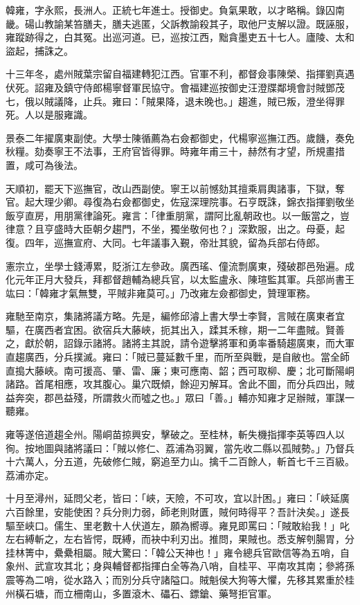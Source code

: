 \begin{pinyinscope}
韓雍，字永熙，長洲人。正統七年進士。授御史。負氣果敢，以才略稱。錄囚南畿。碭山教諭某笞膳夫，膳夫逃匿，父訴教諭殺其子，取他尸支解以證。既誣服，雍蹤跡得之，白其冤。出巡河道。已，巡按江西，黜貪墨吏五十七人。廬陵、太和盜起，捕誅之。

十三年冬，處州賊葉宗留自福建轉犯江西。官軍不利，都督僉事陳榮、指揮劉真遇伏死。詔雍及鎮守侍郎楊寧督軍民協守。會福建巡按御史汪澄牒鄰境會討賊鄧茂七，俄以賊議降，止兵。雍曰：「賊果降，退未晚也。」趨進，賊已叛，澄坐得罪死。人以是服雍識。

景泰二年擢廣東副使。大學士陳循薦為右僉都御史，代楊寧巡撫江西。歲饑，奏免秋糧。劾奏寧王不法事，王府官皆得罪。時雍年甫三十，赫然有才望，所規畫措置，咸可為後法。

天順初，罷天下巡撫官，改山西副使。寧王以前憾劾其擅乘肩輿諸事，下獄，奪官。起大理少卿。尋復為右僉都御史，佐寇深理院事。石亨既誅，錦衣指揮劉敬坐飯亨直房，用朋黨律論死。雍言：「律重朋黨，謂阿比亂朝政也。以一飯當之，豈律意？且亨盛時大臣朝夕趨門，不坐，獨坐敬何也？」深歎服，出之。母憂，起復。四年，巡撫宣府、大同。七年議事入覲，帝壯其貌，留為兵部右侍郎。

憲宗立，坐學士錢溥累，貶浙江左參政。廣西瑤、僮流剽廣東，殘破郡邑殆遍。成化元年正月大發兵，拜都督趙輔為總兵官，以太監盧永、陳瑄監其軍。兵部尚書王竑曰：「韓雍才氣無雙，平賊非雍莫可。」乃改雍左僉都御史，贊理軍務。

雍馳至南京，集諸將議方略。先是，編修邱濬上書大學士李賢，言賊在廣東者宜驅，在廣西者宜困。欲宿兵大藤峽，扼其出入，蹂其禾稼，期一二年盡賊。賢善之，獻於朝，詔錄示諸將。諸將主其說，請令遊擊將軍和勇率番騎趨廣東，而大軍直趨廣西，分兵撲滅。雍曰：「賊已蔓延數千里，而所至與戰，是自敝也。當全師直搗大藤峽。南可援高、肇、雷、廉；東可應南、韶；西可取柳、慶；北可斷陽峒諸路。首尾相應，攻其腹心。巢穴既傾，餘迎刃解耳。舍此不圖，而分兵四出，賊益奔突，郡邑益殘，所謂救火而噓之也。」眾曰「善。」輔亦知雍才足辦賊，軍謀一聽雍。

雍等遂倍道趨全州。陽峒苗掠興安，擊破之。至桂林，斬失機指揮李英等四人以徇。按地圖與諸將議曰：「賊以修仁、荔浦為羽翼，當先收二縣以孤賊勢。」乃督兵十六萬人，分五道，先破修仁賊，窮追至力山。擒千二百餘人，斬首七千三百級。荔浦亦定。

十月至潯州，延問父老，皆曰：「峽，天險，不可攻，宜以計困。」雍曰：「峽延廣六百餘里，安能使困？兵分則力弱，師老則財匱，賊何時得平？吾計決矣。」遂長驅至峽口。儒生、里老數十人伏道左，願為嚮導。雍見即罵曰：「賊敢紿我！」叱左右縛斬之，左右皆愕，既縛，而袂中利刃出。推問，果賊也。悉支解刳腸胃，分挂林箐中，纍纍相屬。賊大驚曰：「韓公天神也！」雍令總兵官歐信等為五哨，自象州、武宣攻其北；身與輔督都指揮白全等為八哨，自桂平、平南攻其南；參將孫震等為二哨，從水路入；而別分兵守諸隘口。賊魁侯大狗等大懼，先移其累重於桂州橫石塘，而立柵南山，多置滾木、礧石、鏢鎗、藥弩拒官軍。


\end{pinyinscope}
